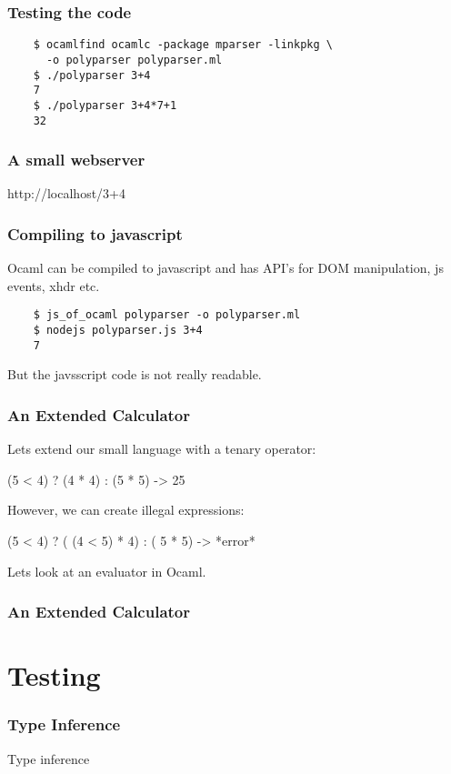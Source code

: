 \documentclass[mathserif,xcolor=svgnames]{beamer}
\renewcommand{\_}{\mathunderscore}
\begin{document}
\begin{frame}[fragile]
  \frametitle{Testing the code}
  \begin{lstlisting}
    $ ocamlfind ocamlc -package mparser -linkpkg \
      -o polyparser polyparser.ml
    $ ./polyparser 3+4
    7
    $ ./polyparser 3+4*7+1
    32
  \end{lstlisting}
\end{frame}

\begin{frame}[fragile]
  \frametitle{A small webserver}
  
  http://localhost/3+4
\end{frame}

\begin{frame}[fragile]
  \frametitle{Compiling to javascript}
  Ocaml can be compiled to javascript and has API's for DOM
  manipulation, js events, xhdr etc.

  \begin{lstlisting}
    $ js_of_ocaml polyparser -o polyparser.ml
    $ nodejs polyparser.js 3+4
    7
  \end{lstlisting}

  But the javsscript code is not really readable.
\end{frame}

\begin{frame}[fragile]
  \frametitle{An Extended Calculator}
  Lets extend our small language with a tenary operator:

  (5 < 4) ? (4 * 4) : (5 * 5) -> 25

  However, we can create illegal expressions:

  (5 < 4) ? ( (4 < 5) * 4) : ( 5 * 5) -> *error*

  Lets look at an evaluator in Ocaml.
\end{frame}

\begin{frame}[fragile]
  \frametitle{An Extended Calculator}
  
\end{frame}

\section{Testing}
\begin{frame}[fragile]
  \frametitle{Type Inference}
  \begin{center}
    \Huge Type inference
  \end{center}
\end{frame}
\end{document}
